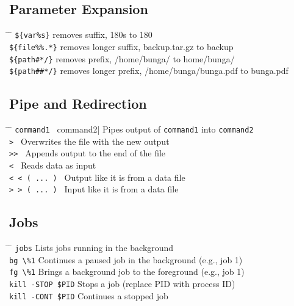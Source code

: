 \documentclass[a4paper,10pt]{article}
\begin{document}
\subsection{Parameter Expansion}
\begin{tabbing}
	\= \hspace{30mm} \= \hspace{80mm} \kill
	\> \lstinline|${var%s}| \> removes suffix, 180s to 180 \\
	\> \lstinline|${file%%.*}| \> removes longer suffix, backup.tar.gz to backup \\
	\> \lstinline|${path#*/}| \> removes prefix, /home/bunga/ to home/bunga/ \\
	\> \lstinline|${path##*/}| \> removes longer prefix, /home/bunga/bunga.pdf to bunga.pdf \\
\end{tabbing}

\subsection{Pipe and Redirection}
\begin{tabbing}
	\= \hspace{60mm} \= \hspace{80mm} \kill
	\> \verb|command1 | command2| \> Pipes output of \verb|command1| into \verb|command2| \\
	\> \verb|> | \> Overwrites the file with the new output \\
	\> \verb|>> | \> Appends output to the end of the file \\
	\> \verb|< | \> Reads data as input \\
	\> \verb|< < ( ... ) | \> Output like it is from a data file \\
	\> \verb|> > ( ... ) | \> Input like it is from a data file \\
\end{tabbing}

\subsection{Jobs}
\begin{tabbing}
	\= \hspace{60mm} \= \hspace{80mm} \kill
	\> \verb|jobs| \> Lists jobs running in the background \\
	\> \verb|bg \%1| \> Continues a paused job in the background (e.g., job 1) \\
	\> \verb|fg \%1| \> Brings a background job to the foreground (e.g., job 1) \\
	\> \verb|kill -STOP $PID| \> Stops a job (replace PID with process ID) \\
	\> \verb|kill -CONT $PID| \> Continues a stopped job \\
\end{tabbing}
\end{document}
